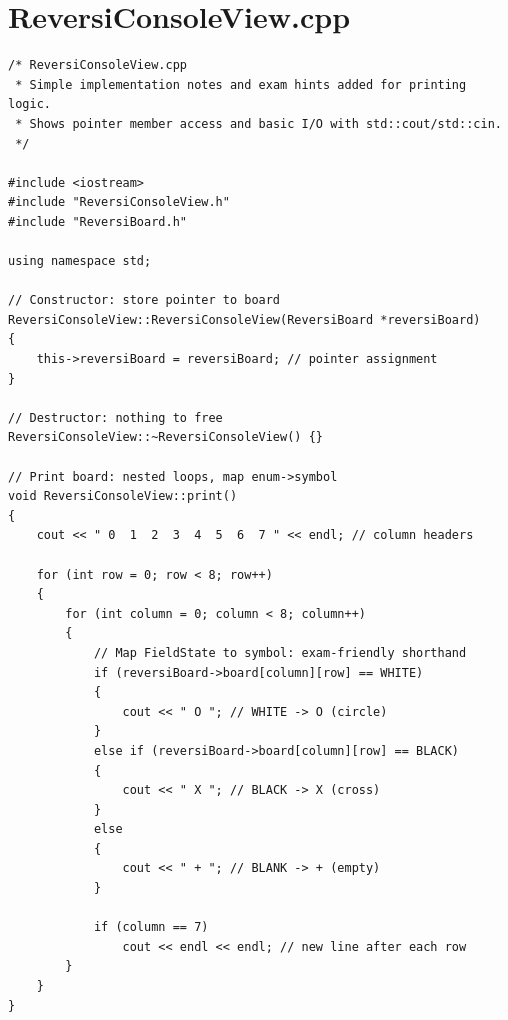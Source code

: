 \documentclass[11pt]{article}
\begin{document}
\section*{ReversiConsoleView.cpp}
\begin{lstlisting}
/* ReversiConsoleView.cpp
 * Simple implementation notes and exam hints added for printing logic.
 * Shows pointer member access and basic I/O with std::cout/std::cin.
 */

#include <iostream>
#include "ReversiConsoleView.h"
#include "ReversiBoard.h"

using namespace std;

// Constructor: store pointer to board
ReversiConsoleView::ReversiConsoleView(ReversiBoard *reversiBoard)
{
	this->reversiBoard = reversiBoard; // pointer assignment
}

// Destructor: nothing to free
ReversiConsoleView::~ReversiConsoleView() {}

// Print board: nested loops, map enum->symbol
void ReversiConsoleView::print()
{
	cout << " 0  1  2  3  4  5  6  7 " << endl; // column headers

	for (int row = 0; row < 8; row++)
	{
		for (int column = 0; column < 8; column++)
		{
			// Map FieldState to symbol: exam-friendly shorthand
			if (reversiBoard->board[column][row] == WHITE)
			{
				cout << " O "; // WHITE -> O (circle)
			}
			else if (reversiBoard->board[column][row] == BLACK)
			{
				cout << " X "; // BLACK -> X (cross)
			}
			else
			{
				cout << " + "; // BLANK -> + (empty)
			}

			if (column == 7)
				cout << endl << endl; // new line after each row
		}
	}
}
\end{lstlisting}
\end{document}
